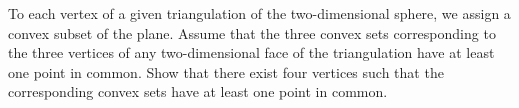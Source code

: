 To each vertex of a given triangulation of the two-dimensional sphere, we assign a convex subset of the plane. Assume that the three convex sets corresponding to the three vertices of any two-dimensional face of the triangulation have at least one point in common. Show that there exist four vertices such that the corresponding convex sets have at least one point in common.